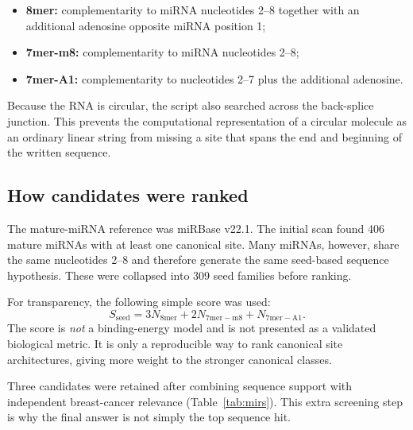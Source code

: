 \documentclass[11pt]{article}
\begin{document}
\begin{itemize}
    \item \textbf{8mer:} complementarity to miRNA nucleotides 2--8 together with an additional adenosine opposite miRNA position 1;
    \item \textbf{7mer-m8:} complementarity to miRNA nucleotides 2--8;
    \item \textbf{7mer-A1:} complementarity to nucleotides 2--7 plus the additional adenosine.
\end{itemize}

Because the RNA is circular, the script also searched across the back-splice junction. This prevents the computational representation of a circular molecule as an ordinary linear string from missing a site that spans the end and beginning of the written sequence.

\subsection{How candidates were ranked}

The mature-miRNA reference was miRBase v22.1. The initial scan found 406 mature miRNAs with at least one canonical site. Many miRNAs, however, share the same nucleotides 2--8 and therefore generate the same seed-based sequence hypothesis. These were collapsed into 309 seed families before ranking.

For transparency, the following simple score was used:
\[
S_{\mathrm{seed}}
=
3N_{8\mathrm{mer}}
+
2N_{7\mathrm{mer-m8}}
+
N_{7\mathrm{mer-A1}}.
\]
The score is \emph{not} a binding-energy model and is not presented as a validated biological metric. It is only a reproducible way to rank canonical site architectures, giving more weight to the stronger canonical classes.

Three candidates were retained after combining sequence support with independent breast-cancer relevance (Table~\ref{tab:mirs}). This extra screening step is why the final answer is not simply the top sequence hit.
\end{document}
